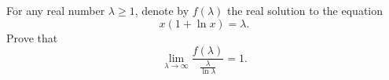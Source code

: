 \begin{problem}
    For any real number \( \lambda \geq 1 \), denote by \( f\left(\lambda\right) \) the real solution to the equation
    \[
        x\left(1 + \ln x\right) = \lambda.
    \]
    Prove that
    \[
        \lim_{\lambda \to \infty} \frac{f\left(\lambda\right)}{\frac{\lambda}{\ln \lambda}} = 1.
    \]
\end{problem}
